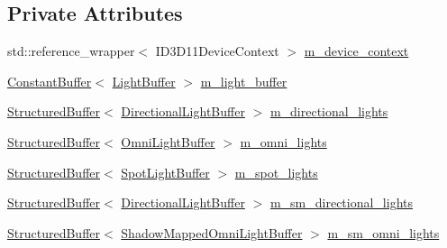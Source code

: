 \subsection*{Private Attributes}
\begin{DoxyCompactItemize}
\item 
std\+::reference\+\_\+wrapper$<$ I\+D3\+D11\+Device\+Context $>$ \mbox{\hyperlink{classmage_1_1rendering_1_1_l_buffer_pass_adccb16b406d2020a7608512cc0f9e6d0}{m\+\_\+device\+\_\+context}}
\item 
\mbox{\hyperlink{classmage_1_1rendering_1_1_constant_buffer}{Constant\+Buffer}}$<$ \mbox{\hyperlink{structmage_1_1rendering_1_1_light_buffer}{Light\+Buffer}} $>$ \mbox{\hyperlink{classmage_1_1rendering_1_1_l_buffer_pass_ab80d18b8193e90588afa5e992b5b1af8}{m\+\_\+light\+\_\+buffer}}
\item 
\mbox{\hyperlink{classmage_1_1rendering_1_1_structured_buffer}{Structured\+Buffer}}$<$ \mbox{\hyperlink{structmage_1_1rendering_1_1_directional_light_buffer}{Directional\+Light\+Buffer}} $>$ \mbox{\hyperlink{classmage_1_1rendering_1_1_l_buffer_pass_a46bc97b1576c1f1702d26c827785c343}{m\+\_\+directional\+\_\+lights}}
\item 
\mbox{\hyperlink{classmage_1_1rendering_1_1_structured_buffer}{Structured\+Buffer}}$<$ \mbox{\hyperlink{structmage_1_1rendering_1_1_omni_light_buffer}{Omni\+Light\+Buffer}} $>$ \mbox{\hyperlink{classmage_1_1rendering_1_1_l_buffer_pass_af7bc4d8ed4d667aa8e6375d6f243d900}{m\+\_\+omni\+\_\+lights}}
\item 
\mbox{\hyperlink{classmage_1_1rendering_1_1_structured_buffer}{Structured\+Buffer}}$<$ \mbox{\hyperlink{structmage_1_1rendering_1_1_spot_light_buffer}{Spot\+Light\+Buffer}} $>$ \mbox{\hyperlink{classmage_1_1rendering_1_1_l_buffer_pass_abc2a2704d99a2a5335d28f3039d600ca}{m\+\_\+spot\+\_\+lights}}
\item 
\mbox{\hyperlink{classmage_1_1rendering_1_1_structured_buffer}{Structured\+Buffer}}$<$ \mbox{\hyperlink{structmage_1_1rendering_1_1_directional_light_buffer}{Directional\+Light\+Buffer}} $>$ \mbox{\hyperlink{classmage_1_1rendering_1_1_l_buffer_pass_a7509575ef1b905079ea56a6f3a4ba513}{m\+\_\+sm\+\_\+directional\+\_\+lights}}
\item 
\mbox{\hyperlink{classmage_1_1rendering_1_1_structured_buffer}{Structured\+Buffer}}$<$ \mbox{\hyperlink{structmage_1_1rendering_1_1_shadow_mapped_omni_light_buffer}{Shadow\+Mapped\+Omni\+Light\+Buffer}} $>$ \mbox{\hyperlink{classmage_1_1rendering_1_1_l_buffer_pass_a3f32431790f55b3959713ae44c1847f9}{m\+\_\+sm\+\_\+omni\+\_\+lights}}

\end{DoxyCompactItemize}
